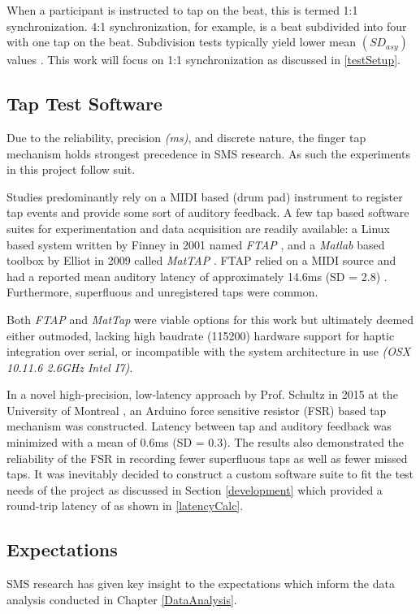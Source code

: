 When a participant is instructed to tap on the beat, this is termed 1:1 synchronization. 4:1 synchronization, for example, is a beat subdivided into four with one tap on the beat. Subdivision tests typically yield lower mean $(SD_{asy})$ values \cite{repp2013sensorimotor}. This work will focus on 1:1 synchronization as discussed in \ref{testSetup}.

\subsection{Tap Test Software} \label{ttsw}
Due to the reliability, precision \textit{(ms)}, and discrete nature, the finger tap mechanism holds strongest precedence in SMS research. As such the experiments in this project follow suit. 

Studies predominantly rely on a MIDI based (drum pad) instrument to register tap events and provide some sort of auditory feedback. A few tap based software suites for experimentation and data acquisition are readily available: a Linux based system written by Finney in 2001 named \textit{FTAP} \cite{finney2001ftap}, and a \textit{Matlab} based toolbox by Elliot in 2009 called \textit{MatTAP} \cite{elliott2009mattap}. FTAP relied on a MIDI source and had a reported mean auditory latency of approximately 14.6ms (SD = 2.8) \cite{schultz2016tap}. Furthermore, superfluous and unregistered taps were common.

Both \textit{FTAP} and \textit{MatTap} were viable options for this work but ultimately deemed either outmoded, lacking high baudrate (115200) hardware support for haptic integration over serial, or incompatible with the system architecture in use \textit{(OSX 10.11.6 2.6GHz Intel I7)}.

In a novel high-precision, low-latency approach by Prof. Schultz in 2015 at the University of Montreal \cite{schultz2016tap}, an Arduino force sensitive resistor (FSR) based tap mechanism was constructed. Latency between tap and auditory feedback was minimized with a mean of 0.6ms (SD = 0.3). The results also demonstrated the reliability of the FSR in recording fewer superfluous taps as well as fewer missed taps.
It was inevitably decided to construct a custom software suite to fit the test needs of the project as discussed in Section \ref{development} which provided a round-trip latency of 
as shown in \ref{latencyCalc}.

\subsection{Expectations} \label{SMSFindings}
SMS research has given key insight to the expectations which inform the data analysis conducted in Chapter \ref{DataAnalysis}.

